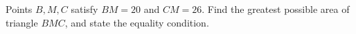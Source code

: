 Points $B,M,C$ satisfy $BM=20$ and $CM=26$. Find the greatest possible area of triangle $BMC$, and state the equality condition.
